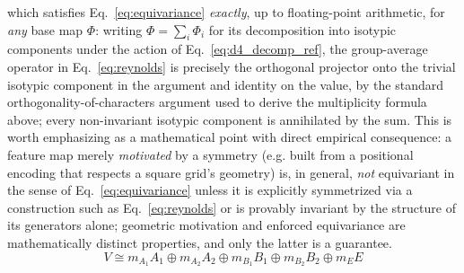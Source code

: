 \documentclass[11pt]{article}
\begin{document}
which satisfies Eq.~\eqref{eq:equivariance} \emph{exactly}, up to floating-point arithmetic, for \emph{any} base map $\Phi$: writing $\Phi = \sum_i \Phi_i$ for its decomposition into isotypic components under the action of Eq.~\eqref{eq:d4_decomp_ref}, the group-average operator in Eq.~\eqref{eq:reynolds} is precisely the orthogonal projector onto the trivial isotypic component in the argument and identity on the value, by the standard orthogonality-of-characters argument used to derive the multiplicity formula above; every non-invariant isotypic component is annihilated by the sum. This is worth emphasizing as a mathematical point with direct empirical consequence: a feature map merely \emph{motivated} by a symmetry (e.g. built from a positional encoding that respects a square grid's geometry) is, in general, \emph{not} equivariant in the sense of Eq.~\eqref{eq:equivariance} unless it is explicitly symmetrized via a construction such as Eq.~\eqref{eq:reynolds} or is provably invariant by the structure of its generators alone; geometric motivation and enforced equivariance are mathematically distinct properties, and only the latter is a guarantee.
\begin{equation}
V \cong m_{A_1} A_1 \oplus m_{A_2} A_2 \oplus m_{B_1} B_1 \oplus m_{B_2} B_2 \oplus m_E E
\label{eq:d4_decomp_ref}
\end{equation}
\end{document}
